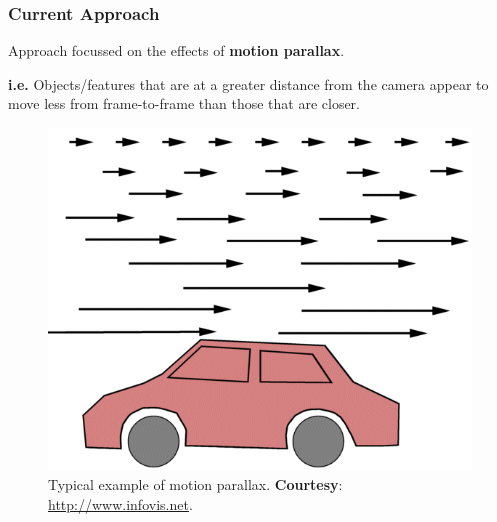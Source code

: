 \documentclass[10pt, compress]{beamer}
\begin{document}
\begin{frame}[fragile]
  \frametitle{Current Approach}

  Approach focussed on the effects of \textbf{motion parallax}. \\ \vspace{0.5cm}
  
  \textbf{i.e.} Objects/features that are at a greater distance from the camera appear to  move less from frame-to-frame than those that are closer.
  
\begin{figure}[ht!]
\centering
\includegraphics[scale=0.2]{motion_parallax.png}
    \caption{Typical example of motion parallax. \textbf{Courtesy}: \href{http://www.infovis.net}{http://www.infovis.net}.}
  \end{figure}
  

\end{frame}
\end{document}
